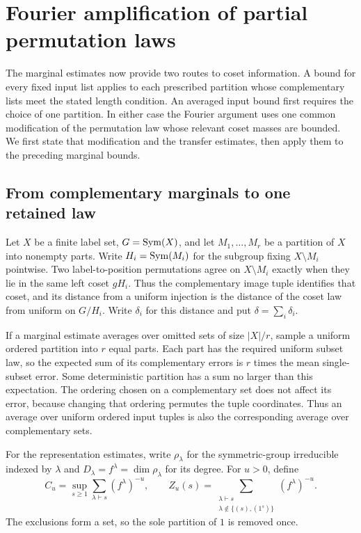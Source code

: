 \section{Fourier amplification of partial permutation laws}
\label{shear:sec:completion}

The marginal estimates now provide two routes to coset information.
A bound for every fixed input list applies to each prescribed partition
whose complementary lists meet the stated length condition. An averaged
input bound first requires the choice of one partition. In either case
the Fourier argument uses one common
modification of the permutation law whose relevant coset masses are
bounded. We first state that modification and the transfer estimates,
then apply them to the preceding marginal bounds.

\subsection{From complementary marginals to one retained law}

Let \(X\) be a finite label set, \(G=\operatorname{Sym}(X)\), and let
\(M_1,\ldots,M_r\) be a partition of \(X\) into nonempty parts. Write
\(H_i=\operatorname{Sym}(M_i)\) for the subgroup fixing \(X\setminus M_i\) pointwise.
Two label-to-position permutations agree on \(X\setminus M_i\) exactly
when they lie in the same left coset \(gH_i\). Thus the complementary
image tuple identifies that coset, and its distance from a uniform
injection is the distance of the coset law from uniform on \(G/H_i\).
Write \(\delta_i\) for this distance and put
\(\delta=\sum_i\delta_i\).

If a marginal estimate averages over omitted sets of size \(|X|/r\),
sample a uniform ordered partition into \(r\) equal parts. Each part
has the required uniform subset law, so the expected sum of its
complementary errors is \(r\) times the mean single-subset error.
Some deterministic partition has a sum no larger than this expectation.
The ordering chosen on a complementary set does not affect its error,
because changing that ordering permutes the tuple coordinates.
Thus an average over uniform ordered input tuples is also the
corresponding average over complementary sets.

For the representation estimates, write \(\rho_\lambda\) for the
symmetric-group irreducible indexed by \(\lambda\) and
\(D_\lambda=f^\lambda=\dim\rho_\lambda\) for its degree. For \(u>0\), define
\[
 C_u=\sup_{s\ge1}\sum_{\lambda\vdash s}(f^\lambda)^{-u},
 \qquad
 Z_u(s)=\sum_{\substack{\lambda\vdash s\\
                   \lambda\notin\{(s),(1^s)\}}}(f^\lambda)^{-u}.
\]
The exclusions form a set, so the sole partition of \(1\) is removed once.

